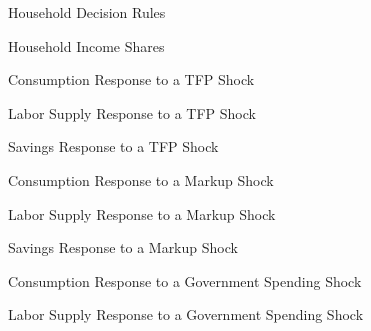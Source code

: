 \begin{figure}[ht]
    \centering
    \caption{Household Decision Rules}
    
    \label{fig:hh-pol-rules}
\end{figure}

\begin{figure}[ht]
    \centering
    \caption{Household Income Shares}
    
    \label{fig:hh-income-shares}
\end{figure}

\begin{figure}[ht]
    \centering
    \caption{Consumption Response to a TFP Shock}
    
\end{figure}

\begin{figure}[ht]
    \centering
    \caption{Labor Supply Response to a TFP Shock}
    
\end{figure}

\begin{figure}[ht]
    \centering
    \caption{Savings Response to a TFP Shock}
    
\end{figure}

\begin{figure}[ht]
    \centering
    \caption{Consumption Response to a Markup Shock}
    
\end{figure}

\begin{figure}[ht]
    \centering
    \caption{Labor Supply Response to a Markup Shock}
    
\end{figure}

\begin{figure}[ht]
    \centering
    \caption{Savings Response to a Markup Shock}
    
\end{figure}

\begin{figure}[ht]
    \centering
    \caption{Consumption Response to a Government Spending Shock}
    
\end{figure}

\begin{figure}[ht]
    \centering
    \caption{Labor Supply Response to a Government Spending Shock}
    
\end{figure}

